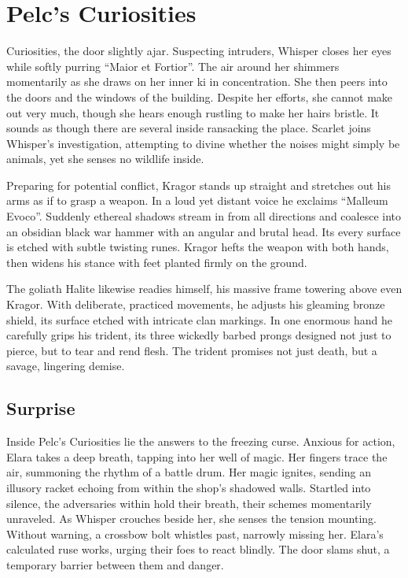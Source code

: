 \documentclass[
  letterpaper,12pt,twoside,twocolumn,openany,
  nodeprecatedcode,bg=full]{dndbook}
\begin{document}
\chapter{Pelc's Curiosities}\label{pelcs-curiosities}

\hfill\break
Curiosities, the door slightly ajar. Suspecting intruders, Whisper
closes her eyes while softly purring ``Maior et Fortior''. The air
around her shimmers momentarily as she draws on her inner ki in
concentration. She then peers into the doors and the windows of the
building. Despite her efforts, she cannot make out very much, though she
hears enough rustling to make her hairs bristle. It sounds as though
there are several inside ransacking the place. Scarlet joins Whisper's
investigation, attempting to divine whether the noises might simply be
animals, yet she senses no wildlife inside.

Preparing for potential conflict, Kragor stands up straight and
stretches out his arms as if to grasp a weapon. In a loud yet distant
voice he exclaims ``Malleum Evoco''. Suddenly ethereal shadows stream in
from all directions and coalesce into an obsidian black war hammer with
an angular and brutal head. Its every surface is etched with subtle
twisting runes. Kragor hefts the weapon with both hands, then widens his
stance with feet planted firmly on the ground.

The goliath Halite likewise readies himself, his massive frame towering
above even Kragor. With deliberate, practiced movements, he adjusts his
gleaming bronze shield, its surface etched with intricate clan markings.
In one enormous hand he carefully grips his trident, its three wickedly
barbed prongs designed not just to pierce, but to tear and rend flesh.
The trident promises not just death, but a savage, lingering demise.

\section{Surprise}\label{surprise}

Inside Pelc's Curiosities lie the answers to the freezing curse. Anxious
for action, Elara takes a deep breath, tapping into her well of magic.
Her fingers trace the air, summoning the rhythm of a battle drum. Her
magic ignites, sending an illusory racket echoing from within the shop's
shadowed walls. Startled into silence, the adversaries within hold their
breath, their schemes momentarily unraveled. As Whisper crouches beside
her, she senses the tension mounting. Without warning, a crossbow bolt
whistles past, narrowly missing her. Elara's calculated ruse works,
urging their foes to react blindly. The door slams shut, a temporary
barrier between them and danger.
\end{document}
